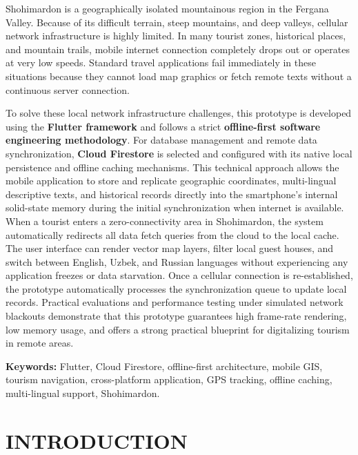\documentclass[12pt,a4paper,oneside]{report}
\begin{document}
Shohimardon is a geographically isolated mountainous region in the Fergana Valley.
Because of its difficult terrain, steep mountains, and deep valleys, cellular network
infrastructure is highly limited. In many tourist zones, historical places, and
mountain trails, mobile internet connection completely drops out or operates at very
low speeds. Standard travel applications fail immediately in these situations because
they cannot load map graphics or fetch remote texts without a continuous server
connection.

To solve these local network infrastructure challenges, this prototype is developed
using the \textbf{Flutter framework} and follows a strict \textbf{offline-first software
engineering methodology}. For database management and remote data synchronization,
\textbf{Cloud Firestore} is selected and configured with its native local persistence
and offline caching mechanisms. This technical approach allows the mobile application
to store and replicate geographic coordinates, multi-lingual descriptive texts, and
historical records directly into the smartphone's internal solid-state memory during
the initial synchronization when internet is available. When a tourist enters a
zero-connectivity area in Shohimardon, the system automatically redirects all data
fetch queries from the cloud to the local cache. The user interface can render vector
map layers, filter local guest houses, and switch between English, Uzbek, and Russian
languages without experiencing any application freezes or data starvation. Once a
cellular connection is re-established, the prototype automatically processes the
synchronization queue to update local records. Practical evaluations and performance
testing under simulated network blackouts demonstrate that this prototype guarantees
high frame-rate rendering, low memory usage, and offers a strong practical blueprint
for digitalizing tourism in remote areas.

\vspace{0.4cm}
\noindent\textbf{Keywords:} Flutter, Cloud Firestore, offline-first architecture,
mobile GIS, tourism navigation, cross-platform application, GPS tracking, offline
caching, multi-lingual support, Shohimardon.

\chapter*{INTRODUCTION}
\end{document}
